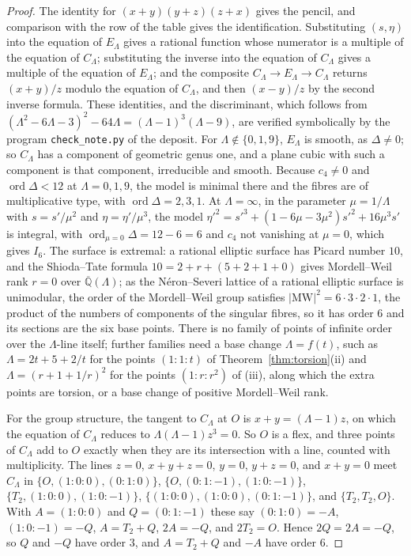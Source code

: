 \documentclass[11pt]{amsart}
\theoremstyle{definition}
\theoremstyle{remark}
\newcommand{\Q}{\mathbb{Q}}
\begin{document}
\begin{proof}
The identity for $(x+y)(y+z)(z+x)$ gives the pencil, and comparison with the row of the table gives the identification. Substituting $(s,\eta)$ into the equation of $E_\Lambda$ gives a rational function whose numerator is a multiple of the equation of $C_\Lambda$; substituting the inverse into the equation of $C_\Lambda$ gives a multiple of the equation of $E_\Lambda$; and the composite $C_\Lambda\to E_\Lambda\to C_\Lambda$ returns $(x+y)/z$ modulo the equation of $C_\Lambda$, and then $(x-y)/z$ by the second inverse formula. These identities, and the discriminant, which follows from $(\Lambda^2-6\Lambda-3)^2-64\Lambda=(\Lambda-1)^3(\Lambda-9)$, are verified symbolically by the program \texttt{check\_note.py} of the deposit. For $\Lambda\notin\{0,1,9\}$, $E_\Lambda$ is smooth, as $\Delta\ne0$; so $C_\Lambda$ has a component of geometric genus one, and a plane cubic with such a component is that component, irreducible and smooth. Because $c_4\ne0$ and $\operatorname{ord}\Delta<12$ at $\Lambda=0,1,9$, the model is minimal there and the fibres are of multiplicative type, with $\operatorname{ord}\Delta=2,3,1$. At $\Lambda=\infty$, in the parameter $\mu=1/\Lambda$ with $s=s'/\mu^2$ and $\eta=\eta'/\mu^3$, the model $\eta'^2=s'^3+(1-6\mu-3\mu^2)s'^2+16\mu^3s'$ is integral, with $\operatorname{ord}_{\mu=0}\Delta=12-6=6$ and $c_4$ not vanishing at $\mu=0$, which gives $I_6$. The surface is extremal: a rational elliptic surface has Picard number $10$, and the Shioda--Tate formula $10=2+r+(5+2+1+0)$ gives Mordell--Weil rank $r=0$ over $\overline{\Q}(\Lambda)$; as the N\'eron--Severi lattice of a rational elliptic surface is unimodular, the order of the Mordell--Weil group satisfies $|\mathrm{MW}|^2=6\cdot3\cdot2\cdot1$, the product of the numbers of components of the singular fibres, so it has order $6$ and its sections are the six base points. There is no family of points of infinite order over the $\Lambda$-line itself; further families need a base change $\Lambda=f(t)$, such as $\Lambda=2t+5+2/t$ for the points $(1:1:t)$ of Theorem~\ref{thm:torsion}(ii) and $\Lambda=(r+1+1/r)^2$ for the points $(1:r:r^2)$ of (iii), along which the extra points are torsion, or a base change of positive Mordell--Weil rank.

For the group structure, the tangent to $C_\Lambda$ at $O$ is $x+y=(\Lambda-1)z$, on which the equation of $C_\Lambda$ reduces to $\Lambda(\Lambda-1)z^3=0$. So $O$ is a flex, and three points of $C_\Lambda$ add to $O$ exactly when they are its intersection with a line, counted with multiplicity. The lines $z=0$, $x+y+z=0$, $y=0$, $y+z=0$, and $x+y=0$ meet $C_\Lambda$ in $\{O,(1:0:0),(0:1:0)\}$, $\{O,(0:1:-1),(1:0:-1)\}$, $\{T_2,(1:0:0),(1:0:-1)\}$, $\{(1:0:0),(1:0:0),(0:1:-1)\}$, and $\{T_2,T_2,O\}$. With $A=(1:0:0)$ and $Q=(0:1:-1)$ these say $(0:1:0)=-A$, $(1:0:-1)=-Q$, $A=T_2+Q$, $2A=-Q$, and $2T_2=O$. Hence $2Q=2A=-Q$, so $Q$ and $-Q$ have order $3$, and $A=T_2+Q$ and $-A$ have order $6$.
\end{proof}
\end{document}
